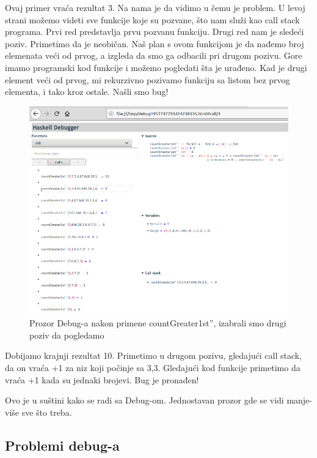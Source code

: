 \documentclass[a4paper]{article}
\begin{document}
{Ovaj primer vraća rezultat 3. Na nama je da vidimo u čemu je problem. U levoj strani možemo videti sve funkcije koje su pozvane, što nam služi kao call stack programa. Prvi red predstavlja prvu pozvanu funkciju. Drugi red nam je sledeći poziv. Primetimo da je neobičan. Naš plan s ovom funkcijom je da nađemo broj elemenata veći od prvog, a izgleda da smo ga odbacili pri drugom pozivu.
Gore imamo programski kod funkcije i možemo pogledati šta je urađeno.
Kad je drugi element veći od prvog, mi rekurzivno pozivamo funkciju sa listom bez prvog elementa, i tako kroz ostale. Našli smo bug!

\begin{figure}[h!]
\begin{center}
\includegraphics[scale=0.3]{mitchell-browser-pregled''.png}
\caption{Prozor Debug-a nakon primene countGreater1st'', izabrali smo drugi poziv da pogledamo}
\end{center}
\end{figure}

Dobijamo krajnji rezultat 10. Primetimo u drugom pozivu, gledajući call stack, da on vraća +1 za niz koji počinje sa 3,3. Gledajući kod funkcije primetimo da vraća +1 kada su jednaki brojevi. Bug je pronađen!

Ovo je u suštini kako se radi sa Debug-om. Jednostavan prozor gde se vidi manje-više sve što treba.

\subsection{Problemi debug-a}

}
\end{document}
